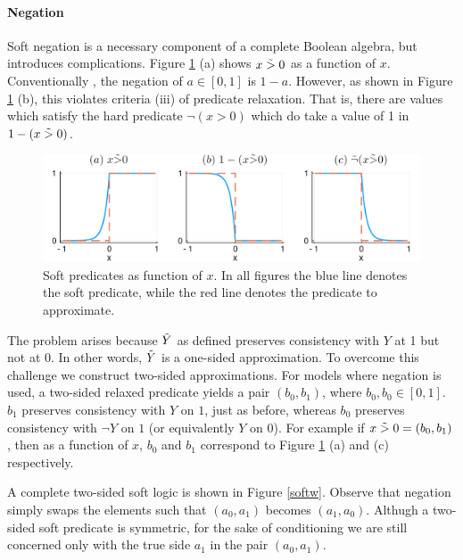 \paragraph{Negation}
Soft negation is a necessary component of a complete Boolean algebra, but introduces complications.
Figure \ref{negationimg} (a) shows $x \mathrel{\tilde{>}} 0$ as a function of $x$.
Conventionally  \cite{}, the negation of $a \in [0, 1]$ is $1 - a$.
However, as shown in Figure \ref{negationimg} (b), this violates criteria (iii) of predicate relaxation.
That is, there are values which satisfy the hard predicate $\neg(x > 0)$ which do take a value of 1 in $1 - (x \mathrel{\tilde{>}} 0)$.

\begin{figure}
\includegraphics[width=\linewidth]{negation.pdf}
\caption{Soft predicates as function of $x$.  In all figures the blue line denotes the soft predicate, while the red line denotes the predicate to approximate.}\label{negationimg}
\end{figure}


The problem arises because $\mathrel{\tilde{Y}}$ as defined preserves consistency with $Y$ at 1 but not at 0.
In other words, $\mathrel{\tilde{Y}}$ is a one-sided approximation.
To overcome this challenge we construct two-sided approximations.
For models where negation is used, a two-sided relaxed predicate yields a pair $(b_0, b_1)$, where $b_0, b_0 \in [0, 1]$.
$b_1$ preserves consistency with $Y$ on $1$, just as before, whereas $b_0$ preserves consistency with $\neg Y$ on $1$ (or equivalently $Y$ on 0).
For example if $x \mathrel{\tilde{>}} 0 = (b_0, b_1)$, then as a function of $x$, $b_0$ and $b_1$ correspond to Figure \ref{negationimg} (a) and (c) respectively.

A complete two-sided soft logic is shown in Figure \ref{softw}.
Observe that negation simply swaps the elements such that $(a_0, a_1)$ becomes $(a_1, a_0)$.
Althugh a two-sided soft predicate is symmetric, for the sake of conditioning we are still concerned only with the true side $a_1$ in the pair $(a_0, a_1)$.


